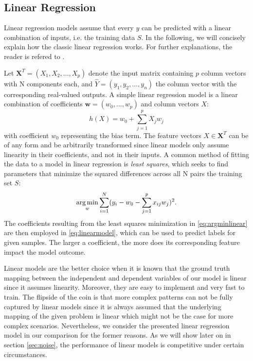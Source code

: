 \subsection{Linear Regression}

Linear regression models assume that every $ y $ can be predicted with a linear combination of inputs, i.e. the training data $ S $. In the following, we will concisely explain how the classic linear regression works. For further explanations, the reader is refered to \cite{friedman2001elements}.

Let $ \textbf{X}^{T} = (X_1, X_2, \dots, X_p) $ denote the input matrix containing $ p $ column vectors with N components each, and $ \hat{Y} = (y_1, y_2, \dots, y_n)$ the column vector with the corresponding real-valued outputs. A simple linear regression model is a linear combination of coefficients $ \mathbf{w} = (w_0, \dots, w_p) $ and column vectors $ X $:
\begin{equation}\label{eq:linearmodel}
h(X) = w_0 + \sum_{j=1}^{p} X_jw_j
\end{equation}
with coefficient $ w_0 $ representing the bias term. The feature vectors $ X \in \textbf{X}^{T} $ can be of any form and be arbitrarily transformed since linear models only assume linearity in their coefficients, and not in their inputs.
A common method of fitting the data to a model in linear regression is \textit{least squares}, which seeks to find parameters that minimize the squared differences across all N pairs the training set $ S $:
\begin{equation}\label{eq:argminlinear}
\operatorname*{arg\,min}_{w} \sum_{i=1}^{N}(y_i - w_0 - \sum_{j=1}^{p} x_{ij}w_j)^2. 
\end{equation}
The coefficients resulting from the least squares minimization in \ref{eq:argminlinear} are then employed in \ref{eq:linearmodel}, which can be used to predict labels for given samples. The larger a coefficient, the more does its corresponding feature impact the model outcome. 

Linear models are the better choice when it is known that the ground truth mapping between the independent and dependent variables of our model is linear since it assumes linearity. Moreover, they are easy to implement and very fast to train. The flipside of the coin is that more complex patterns can not be fully captured by linear models since it is always assumed that the underlying mapping of the given problem is linear which might not be the case for more complex scenarios. Nevertheless, we consider the presented linear regression model in our comparison for the former reasons. As we will  show later on in section \ref{sec:noise}, the performance of linear models is competitive under certain circumstances.

